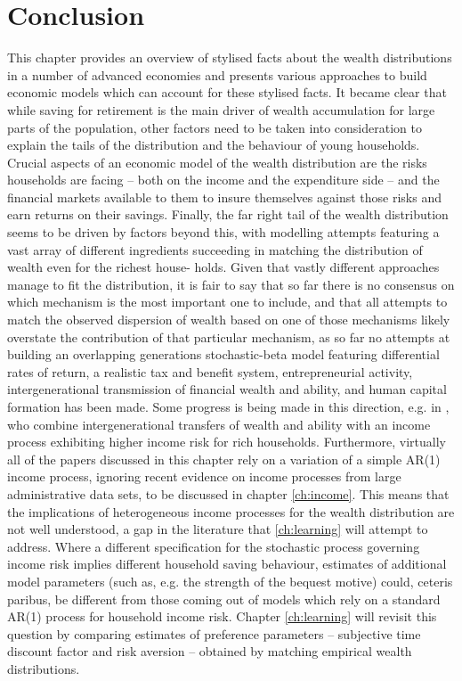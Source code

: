\section{Conclusion}
This chapter provides an overview of stylised facts about the wealth 
distributions in a number of advanced economies and presents various approaches 
to build economic models which can account for these stylised facts.
It became clear that while saving for retirement is the main driver of wealth
accumulation for large parts of the population, other factors need to be taken
into consideration to explain the tails of the distribution and the behaviour of
young households. Crucial aspects of an economic model of the wealth 
distribution are the risks households are facing -- both on the income and the 
expenditure side -- and the financial markets available to them to insure 
themselves against those risks and earn returns on their savings. Finally, the 
far right tail of the wealth distribution seems to be driven by factors beyond 
this, with modelling attempts featuring a vast array of different ingredients 
succeeding in matching the distribution of wealth even for the richest house-
holds. Given that vastly different approaches manage to fit the distribution, it
is fair to say that so far there is no consensus on which mechanism is the most
important one to include, and that all attempts to match the observed dispersion
of wealth based on one of those mechanisms likely overstate the contribution of 
that particular mechanism, as so far no attempts at building an overlapping 
generations stochastic-beta model featuring differential rates of return, a 
realistic tax and benefit system, entrepreneurial activity, intergenerational 
transmission of financial wealth and ability, and human capital formation has 
been made. Some progress is being made in this direction, e.g. in 
\citet{DeNardiYang2015}, who combine intergenerational transfers of wealth and
ability with an income process exhibiting higher income risk for rich households.
Furthermore, virtually all of the papers discussed in this chapter 
rely on a variation of a simple AR(1) income process, ignoring recent evidence
on income processes from large administrative data sets, to be discussed in 
chapter \ref{ch:income}. This means that the implications of heterogeneous income
processes for the wealth distribution are not well understood, a gap in the 
literature that \ref{ch:learning} will attempt to address. Where a different 
specification for the stochastic process governing income risk implies different
household saving behaviour, estimates of additional model parameters (such as,
e.g. the strength of the bequest motive) could, ceteris paribus, be different 
from those coming out of models which rely on a standard AR(1) process for 
household income risk. Chapter \ref{ch:learning} will revisit this question 
by comparing estimates of preference parameters -- subjective time discount 
factor and risk aversion -- obtained by matching empirical wealth distributions.